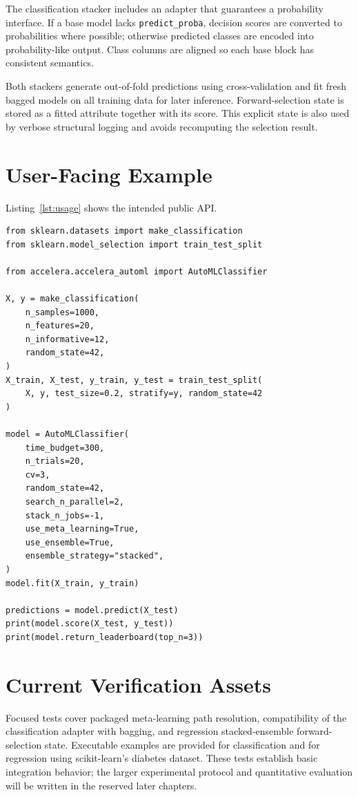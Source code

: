 \documentclass[12pt,a4paper,oneside]{report}
\begin{document}
The classification stacker includes an adapter that guarantees a probability
interface. If a base model lacks \texttt{predict\_proba}, decision scores are
converted to probabilities where possible; otherwise predicted classes are
encoded into probability-like output. Class columns are aligned so each base
block has consistent semantics.

\medskip

\noindent Both stackers generate out-of-fold predictions using cross-validation and fit
fresh bagged models on all training data for later inference. Forward-selection
state is stored as a fitted attribute together with its score. This explicit
state is also used by verbose structural logging and avoids recomputing the
selection result.

\section{User-Facing Example}

Listing~\ref{lst:usage} shows the intended public API.

\begin{lstlisting}[style=pythonstyle,caption={Classification with Accelera AutoML},label={lst:usage}]
from sklearn.datasets import make_classification
from sklearn.model_selection import train_test_split

from accelera.accelera_automl import AutoMLClassifier

X, y = make_classification(
    n_samples=1000,
    n_features=20,
    n_informative=12,
    random_state=42,
)
X_train, X_test, y_train, y_test = train_test_split(
    X, y, test_size=0.2, stratify=y, random_state=42
)

model = AutoMLClassifier(
    time_budget=300,
    n_trials=20,
    cv=3,
    random_state=42,
    search_n_parallel=2,
    stack_n_jobs=-1,
    use_meta_learning=True,
    use_ensemble=True,
    ensemble_strategy="stacked",
)
model.fit(X_train, y_train)

predictions = model.predict(X_test)
print(model.score(X_test, y_test))
print(model.return_leaderboard(top_n=3))
\end{lstlisting}

\section{Current Verification Assets}

Focused tests cover packaged meta-learning path resolution, compatibility of
the classification adapter with bagging, and regression stacked-ensemble
forward-selection state. Executable examples are provided for classification
and for regression using scikit-learn's diabetes dataset. These tests establish
basic integration behavior; the larger experimental protocol and quantitative
evaluation will be written in the reserved later chapters.
\end{document}
